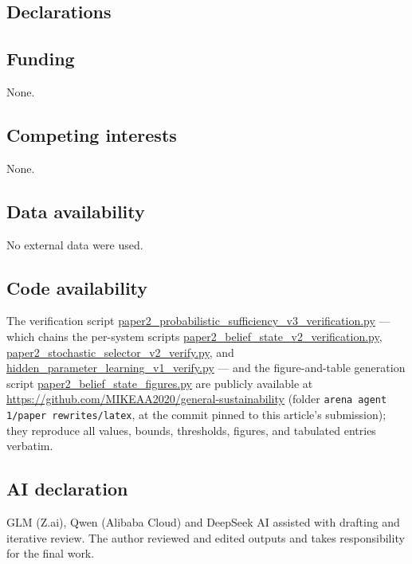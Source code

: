\documentclass[10pt,twocolumn]{article}
\theoremstyle{plain}
\theoremstyle{definition}
\theoremstyle{remark}
\begin{document}
\subsection*{Declarations}

\subsection*{Funding}
None.

\subsection*{Competing interests}
None.

\subsection*{Data availability}
No external data were used.

\subsection*{Code availability}
The verification script
\url{paper2_probabilistic_sufficiency_v3_verification.py} --- which chains
the per-system scripts \url{paper2_belief_state_v2_verification.py},
\url{paper2_stochastic_selector_v2_verify.py}, and
\url{hidden_parameter_learning_v1_verify.py} --- and the figure-and-table
generation script \url{paper2_belief_state_figures.py} are publicly
available at \url{https://github.com/MIKEAA2020/general-sustainability}
(folder \texttt{arena agent 1/paper rewrites/latex}, at the commit
pinned to this article's submission); they reproduce all values, bounds,
thresholds, figures, and tabulated entries verbatim.

\subsection*{AI declaration}
GLM (Z.ai), Qwen (Alibaba Cloud) and DeepSeek AI assisted with drafting
and iterative review. The author reviewed and edited outputs and takes
responsibility for the final work.
\end{document}
